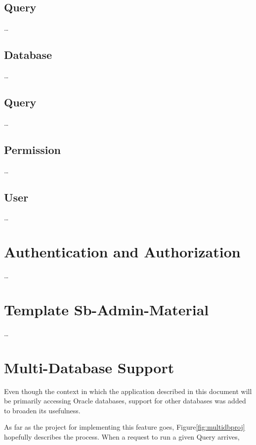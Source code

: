 \subsection{Query}
\dots
\subsection{Database}
\dots
\subsection{Query}\label{model:query}
\dots
\subsection{Permission}
\dots
\subsection{User}\label{model:user}
\dots

\section{Authentication and Authorization}\label{proj:auth}
\dots

\section{Template Sb-Admin-Material}
\dots
\section{Multi-Database Support}

Even though the context in which the application described in this document will be primarily accessing Oracle databases, support for other databases was added to broaden its usefulness.

As far as the project for implementing this feature goes, Figure\ref{fig:multidbproj} hopefully describes the process. When a request to run a given Query arrives,
